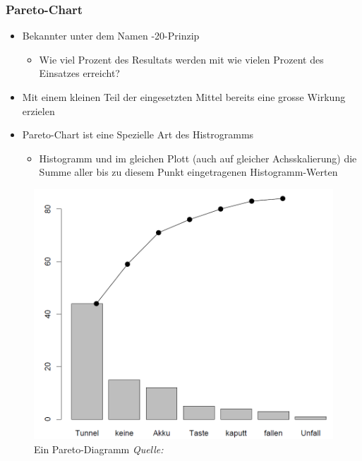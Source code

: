 \subsubsection{Pareto-Chart}
\label{subsubsec:ParetoChart}
\begin{itemize}
	\item Bekannter unter dem Namen -20-Prinzip\grqq
	\begin{itemize}
		\item Wie viel Prozent des Resultats werden mit wie vielen Prozent des Einsatzes erreicht?
	\end{itemize}
	\item Mit einem kleinen Teil der eingesetzten Mittel bereits eine grosse Wirkung erzielen
	\item Pareto-Chart ist eine Spezielle Art des Histrogramms
	\begin{itemize}
		\item Histogramm und im gleichen Plott (auch auf gleicher Achsskalierung) die Summe aller bis zu diesem Punkt eingetragenen Histogramm-Werten
	\end{itemize}
\end{itemize}
\begin{figure}[!h]
	\centering
	\includegraphics[width=0.3\linewidth]{figures/Pareto}
	\caption{Ein Pareto-Diagramm \textit{Quelle:}\cite{C:Pareto}}
	\label{fig:Pareto}
\end{figure}

